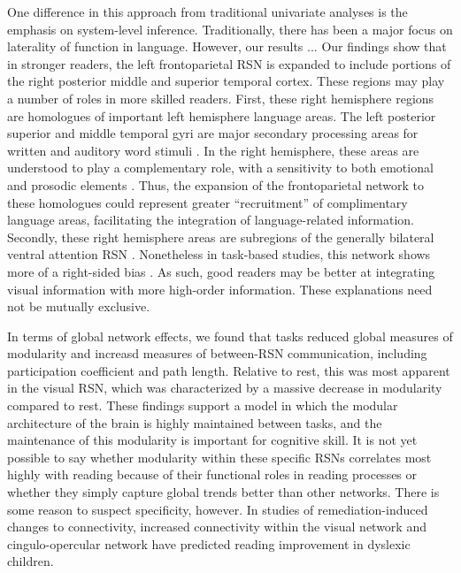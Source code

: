 One difference in this approach from traditional univariate analyses is the emphasis on system-level inference. Traditionally, there has been a major focus on laterality of function in language. However, our results ... Our findings show that in stronger readers, the left frontoparietal RSN is expanded to include portions of the right posterior middle and superior temporal cortex.  These regions may play a number of roles in more skilled readers.  First, these right hemisphere regions are homologues of important left hemisphere language areas. The left posterior superior and middle temporal gyri are major secondary processing areas for written and auditory word stimuli \citep{Price2012}. In the right hemisphere, these areas are understood to play a complementary role, with a sensitivity to both emotional and prosodic elements \citep{Jung-Beeman2005}. Thus, the expansion of the frontoparietal network to these homologues could represent greater ``recruitment'' of complimentary language areas, facilitating  the integration of language-related information.  Secondly, these right hemisphere areas are subregions of the generally bilateral ventral attention RSN \citep{Yeo2011}.  Nonetheless in task-based studies, this network shows more of a right-sided bias \citep{Fox2006}.  As such, good readers may be better at integrating visual information with more high-order information.  These explanations need not be mutually exclusive.

In terms of global network effects, we found that tasks reduced global measures of modularity and increasd measures of between-RSN communication, including participation coefficient and path length. Relative to rest, this was most apparent in the visual RSN, which was characterized by a massive decrease in modularity compared to rest. These findings support a model in which the modular architecture of the brain is highly maintained between tasks, and the maintenance of this modularity is important for cognitive skill. It is not yet possible to say whether modularity within these specific RSNs correlates most highly with reading because of their functional roles in reading processes or whether they simply capture global trends better than other networks. There is some reason to suspect specificity, however. In studies of remediation-induced changes to connectivity, increased connectivity within the visual network \citep{Koyama2013} and cingulo-opercular network \citep{HorowitzKraus2015} have predicted reading improvement in dyslexic children. 

